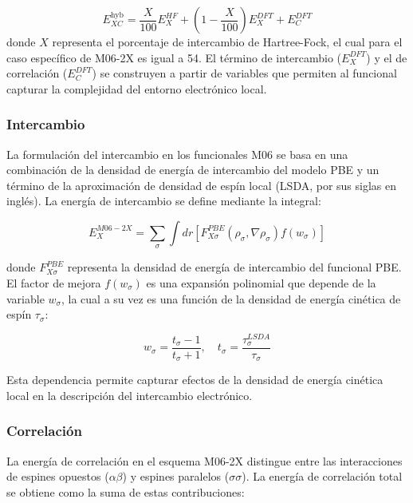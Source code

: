 \begin{equation}
    E_{XC}^{\text{hyb}} = \frac{X}{100} E_{X}^{HF} + \left( 1 - \frac{X}{100} \right) E_{X}^{DFT} + E_{C}^{DFT}
\end{equation}
donde $X$ representa el porcentaje de intercambio de Hartree-Fock, el cual para el caso específico de M06-2X es igual a 54. El término de intercambio ($E_{X}^{DFT}$) y el de correlación ($E_{C}^{DFT}$) se construyen a partir de variables que permiten al funcional capturar la complejidad del entorno electrónico local.

\subsubsection{Intercambio}

La formulación del intercambio en los funcionales M06 se basa en una combinación de la densidad de energía de intercambio del modelo PBE \cite{DFT-1996-01} y un término de la aproximación de densidad de espín local (LSDA, por sus siglas en inglés). La energía de intercambio se define mediante la integral:

\begin{equation}
E^{M06-2X}_{X} = \sum_{\sigma} \int dr \left[ F^{PBE}_{X\sigma}(\rho_{\sigma}, \nabla\rho_{\sigma}) f(w_{\sigma}) \right]
\end{equation}

donde $F^{PBE}_{X\sigma}$ representa la densidad de energía de intercambio del funcional PBE. El factor de mejora $f(w_{\sigma})$ es una expansión polinomial que depende de la variable $w_{\sigma}$, la cual a su vez es una función de la densidad de energía cinética de espín $\tau_{\sigma}$:

\begin{equation}
w_{\sigma} = \frac{t_{\sigma} - 1}{t_{\sigma} + 1}, \quad t_{\sigma} = \frac{\tau^{LSDA}_{\sigma}}{\tau_{\sigma}}
\end{equation}

Esta dependencia permite capturar efectos de la densidad de energía cinética local en la descripción del intercambio electrónico.

\subsubsection{Correlación}

La energía de correlación en el esquema M06-2X distingue entre las interacciones de espines opuestos ($\alpha\beta$) y espines paralelos ($\sigma\sigma$). La energía de correlación total se obtiene como la suma de estas contribuciones:

